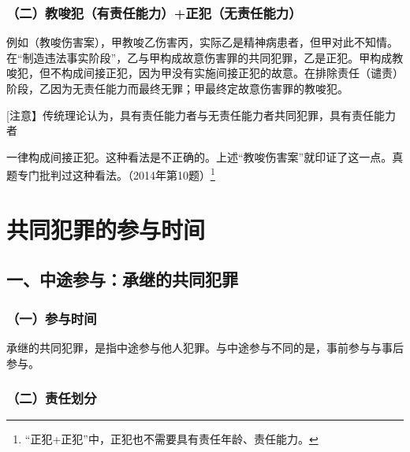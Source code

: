 \subsubsection*{（二）教唆犯（有责任能力）+正犯（无责任能力）}

例如（教唆伤害案），甲教唆乙伤害丙，实际乙是精神病患者，但甲对此不知情。在“制造违法事实阶段”，乙与甲构成故意伤害罪的共同犯罪，乙是正犯。甲构成教唆犯，但不构成间接正犯，因为甲没有实施间接正犯的故意。在排除责任（谴责）阶段，乙因为无责任能力而最终无罪；甲最终定故意伤害罪的教唆犯。

[注意】传统理论认为，具有责任能力者与无责任能力者共同犯罪，具有责任能力者

一律构成间接正犯。这种看法是不正确的。上述“教唆伤害案”就印证了这一点。真题专门批判过这种看法。（2014年第10题）\footnote{“正犯+正犯”中，正犯也不需要具有责任年龄、责任能力。}

\section{共同犯罪的参与时间}

\subsection*{一、中途参与：承继的共同犯罪}

\subsubsection*{（一）参与时间}

承继的共同犯罪，是指中途参与他人犯罪。与中途参与不同的是，事前参与与事后参与。


\subsubsection*{（二）责任划分}

